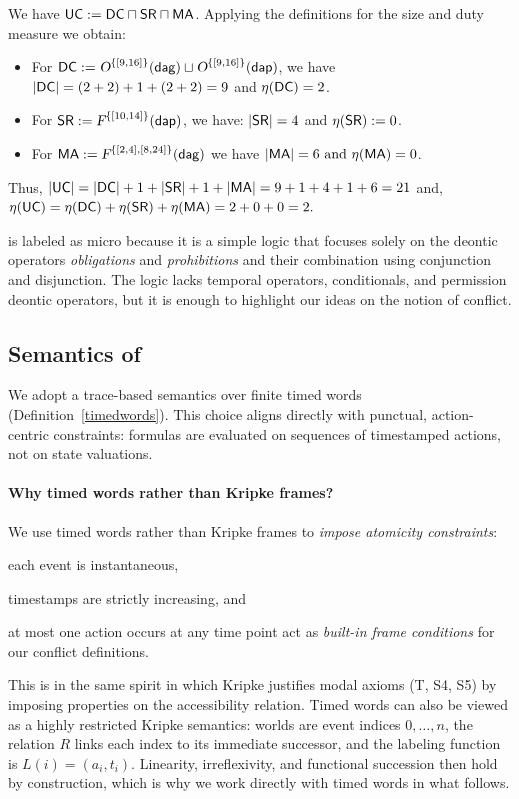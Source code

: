 \begin{example}\label{sizeandeta}

We have $\mathsf{UC} := \mathsf{DC} \sqcap \mathsf{SR} \sqcap \mathsf{MA}$.
Applying the definitions for the size and duty measure we obtain:
\begin{itemize}
\item For $\mathsf{DC}:=\textsl{O}^{\{[9,16]\}}(\mathsf{\mathsf{dag}}) \sqcup \textsl{O}^{\{[9,16]\}}(\mathsf{\mathsf{dap}})$, we have \\ $\vert \mathsf{DC}\vert= (2+2)+1+(2+2) = 9$ and $\eta(\mathsf{DC})=2$.
\item For $\mathsf{SR}:= \textsl{F}^{\{[10,14]\}}(\mathsf{\mathsf{dap}})$, we have: $\vert \mathsf{SR}\vert= 4$ and $\eta(\mathsf{SR}):= 0$.
\item For $\mathsf{MA}:=  \textsl{F}^{\{[2,4],[8,24]\}}(\mathsf{\mathsf{dag}})$ we have $\vert \mathsf{MA}\vert=6 \text{ and } \eta(\mathsf{MA})=0$.
\end{itemize}
Thus, $\vert \mathsf{UC}\vert= \vert \mathsf{DC}\vert+1 +\vert \mathsf{SR}\vert+1+ \vert \mathsf{MA}\vert= 9+1+4+1+6=21$ and,\\
$\eta(\mathsf{UC})= \eta(\mathsf{DC})+\eta(\mathsf{SR})+\eta(\mathsf{MA})=2+0+0=2.$
\end{example}

\TDDLfm is labeled as micro because it is a simple logic that focuses solely on the deontic operators \emph{obligations} and \emph{prohibitions} and their combination using conjunction and disjunction. The logic lacks temporal operators, conditionals, and permission deontic operators, but it is enough to highlight our ideas on the notion of conflict.


\subsection{Semantics of \TDDLfm}
We adopt a trace-based semantics over finite timed words (Definition~\ref{timedwords}). This choice aligns directly with punctual, action-centric constraints: formulas are evaluated on sequences of timestamped actions, not on state valuations.

\paragraph{Why timed words rather than Kripke frames?}
We use timed words rather than Kripke frames to \emph{impose atomicity constraints}: \begin{inparaenum}[(i)]
    \item each event is instantaneous, \item timestamps are strictly increasing, and \item at most one action occurs at any time point act as \emph{built-in frame conditions} for our conflict definitions.
\end{inparaenum} This is in the same spirit in which Kripke justifies modal axioms (T, S4, S5) by imposing properties on the accessibility relation. Timed words can also be viewed as a highly restricted Kripke semantics: worlds are event indices $0,\dots,n$, the relation $R$ links each index to its immediate successor, and the labeling function is $L(i)=(a_i,t_i)$. Linearity, irreflexivity, and functional succession then hold by construction, which is why we work directly with timed words in what follows.



